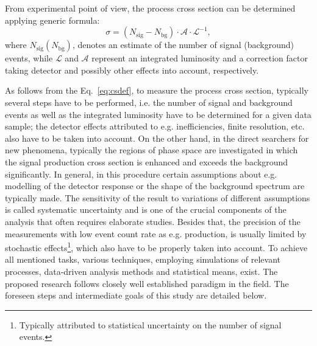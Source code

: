 From experimental point of view, the process cross section can be determined applying generic formula:
\begin{equation}
\sigma = \left(N_{\mathrm{sig}}-N_{\mathrm{bg}}\right)\cdot \mathcal{A} \cdot \mathcal{L}^{-1},
\label{eq:csdef}
\end{equation}
where $N_{\mathrm{sig}}\left(N_{\mathrm{bg}}\right)$, denotes an estimate of the number of signal (background) events, while $\mathcal{L}$ and $\mathcal{A}$ represent an integrated luminosity and a correction factor taking detector and possibly other effects into account, respectively. 

As follows from the Eq.~\eqref{eq:csdef}, to measure the process cross section, typically several steps have to be performed, i.e. the number of signal and background events as well as the integrated luminosity have to be determined for a given data sample; the detector effects attributed to e.g. inefficiencies, finite resolution, etc. also have to be taken into account. On the other hand, in the direct searchers for new phenomena, typically the regions of phase space are investigated in which the signal production cross section is enhanced and exceeds the background significantly. In general, in this procedure certain assumptions about e.g. modelling of the detector response or the shape of the background spectrum are typically made. The sensitivity of the result to variations of different assumptions is called systematic uncertainty and is one of the crucial components of the analysis that often requires elaborate studies. Besides that, the precision of the measurements with low event count rate as e.g. \fourtop production, is usually limited by stochastic effects\footnote{Typically attributed to statistical uncertainty on the number of signal events.}, which also have to be properly taken into account. To achieve all mentioned tasks, various techniques, employing simulations of relevant processes, data-driven analysis methods and statistical means, exist. The proposed research follows closely well established paradigm in the field. The foreseen steps and intermediate goals of this study are detailed below.

